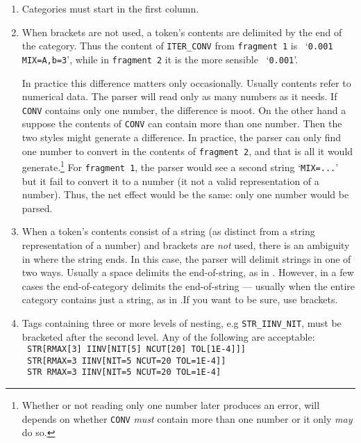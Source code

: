 \documentclass{article}
\begin{document}
\begin{enumerate}

\item Categories must start in the first column.

\item When brackets are not used, a token's contents are delimited by the
      end of the category.  Thus the content of {\tt{}ITER\_CONV} from
      {\tt{}fragment 1} is \ `{\tt{}0.001 MIX=A,b=3}', while in
      {\tt{}fragment 2} it is the more sensible \ `{\tt{}0.001}'.

      In practice this difference matters only occasionally.  Usually
      contents refer to numerical data. The parser will read only as many
      numbers as it needs.  If {\tt{}CONV} contains only one number, the
      difference is moot.  On the other hand a suppose the contents of
      {\tt{}CONV} can contain more than one number.  Then the two styles
      might generate a difference.  In practice, the parser can only find
      one number to convert in the contents of {\tt{}fragment 2}, and that
      is all it would generate.\footnote{Whether or not reading only one
      number later produces an error, will depends on whether {\tt{}CONV}
      \emph{must} contain more than one number or it only \emph{may} do
      so.}  For {\tt{}fragment 1}, the parser would see a second string
      `{\tt{}MIX=...}' but it fail to convert it to a number (it not a
      valid representation of a number). Thus, the net effect would be the
      same: only one number would be parsed.

\item When a token's contents consist of a string (as distinct from a
      string representation of a number) and brackets are \emph{not} used,
      there is an ambiguity in where the string ends.  In this case, the
      parser will delimit strings in one of two ways.  Usually a space
      delimits the end-of-string, as in .\quad
      However, in a few cases the end-of-category delimits the
      end-of-string --- usually when the entire category contains just a
      string, as in .\quad If
      you want to be sure, use brackets.

\item Tags containing three or more levels of nesting, e.g {\tt{}STR\_IINV\_NIT},
      must be bracketed after the second level.  Any of the following
      are acceptable:\\
      {\tt{} STR[RMAX[3] IINV[NIT[5] NCUT[20] TOL[1E-4]]]}\\
      {\tt{} STR[RMAX=3 IINV[NIT=5 NCUT=20 TOL=1E-4]]}\\
      {\tt{} STR RMAX=3 IINV[NIT=5 NCUT=20 TOL=1E-4]}


\end{enumerate}
\end{document}

